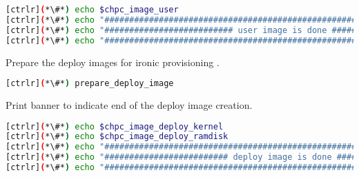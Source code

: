 \begin{lstlisting}[language=bash,keywords={},upquote=true]
[ctrlr](*\#*) echo $chpc_image_user
[ctrlr](*\#*) echo "########################################################################"
[ctrlr](*\#*) echo "########################## user image is done ##########################"
[ctrlr](*\#*) echo "########################################################################"
\end{lstlisting}

	
	Prepare the deploy images for ironic provisioning .

\begin{lstlisting}[language=bash,keywords={},upquote=true]
[ctrlr](*\#*) prepare_deploy_image
\end{lstlisting}

	
	Print banner to indicate end of the deploy image creation.

\begin{lstlisting}[language=bash,keywords={},upquote=true]
[ctrlr](*\#*) echo $chpc_image_deploy_kernel
[ctrlr](*\#*) echo $chpc_image_deploy_ramdisk
[ctrlr](*\#*) echo "########################################################################"
[ctrlr](*\#*) echo "######################### deploy image is done #########################"
[ctrlr](*\#*) echo "########################################################################"
\end{lstlisting}


